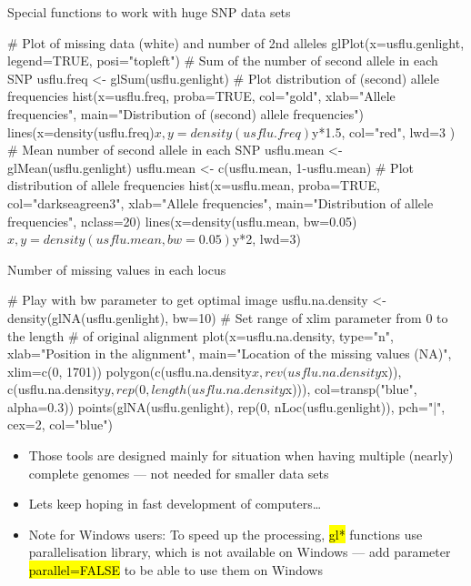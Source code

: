\documentclass[compress, ucs, xelatex, 11pt, xcolor=svgnames,
	hyperref={
		bookmarks=true,
		unicode=true,
		colorlinks=true,
		pdftitle={Molecular data in R},
		plainpages=false,
		pdfauthor={Vojtech Zeisek},
		pdfsubject={Course about phylogeny and evolution in R},
		pdfcreator={XeLaTeX},
		pdfkeywords={R, evolution, phylogeny, molecular data},
		linkcolor=Tomato,
		anchorcolor=SaddleBrown,
		citecolor=Goldenrod,
		filecolor=DarkMagenta,
		menucolor=Sienna,
		urlcolor=DarkTurquoise,
		pdftex},
	url={hyphens, lowtilde} %
	]{beamer}
\renewcommand{\texttt}[1]{\hl{\ttfamily #1}}
\begin{document}
\begin{frame}[fragile]{Special functions to work with huge SNP data sets}
	\begin{spluscode}
    # Plot of missing data (white) and number of 2nd alleles
    glPlot(x=usflu.genlight, legend=TRUE, posi="topleft")
    # Sum of the number of second allele in each SNP
    usflu.freq <- glSum(usflu.genlight)
    # Plot distribution of (second) allele frequencies
    hist(x=usflu.freq, proba=TRUE, col="gold", xlab="Allele
      frequencies", main="Distribution of (second) allele frequencies")
    lines(x=density(usflu.freq)$x, y=density(usflu.freq)$y*1.5,
      col="red", lwd=3 )
    # Mean number of second allele in each SNP
    usflu.mean <- glMean(usflu.genlight)
    usflu.mean <- c(usflu.mean, 1-usflu.mean)
    # Plot distribution of allele frequencies
    hist(x=usflu.mean, proba=TRUE, col="darkseagreen3",
      xlab="Allele frequencies", main="Distribution of allele
      frequencies", nclass=20)
    lines(x=density(usflu.mean, bw=0.05)$x, y=density(usflu.mean,
      bw=0.05)$y*2, lwd=3)
	\end{spluscode}
\end{frame}

\begin{frame}[fragile]{Number of missing values in each locus}
	\begin{spluscode}
    # Play with bw parameter to get optimal image
    usflu.na.density <- density(glNA(usflu.genlight), bw=10)
    # Set range of xlim parameter from 0 to the length
    # of original alignment
    plot(x=usflu.na.density, type="n", xlab="Position in the alignment",
      main="Location of the missing values (NA)", xlim=c(0, 1701))
    polygon(c(usflu.na.density$x, rev(usflu.na.density$x)),
      c(usflu.na.density$y, rep(0, length(usflu.na.density$x))),
      col=transp("blue", alpha=0.3))
    points(glNA(usflu.genlight), rep(0, nLoc(usflu.genlight)),
      pch="|", cex=2, col="blue")
	\end{spluscode}
	\begin{itemize}
		\item Those tools are designed mainly for situation when having multiple (nearly) complete genomes --- not needed for smaller data sets
		\item Lets keep hoping in fast development of computers\ldots
		\item \alert{Note for Windows users:} To speed up the processing, \texttt{gl*} functions use parallelisation library, which is not available on Windows --- add parameter \texttt{parallel=FALSE} to be able to use them on Windows
	\end{itemize}
\end{frame}
\end{document}
